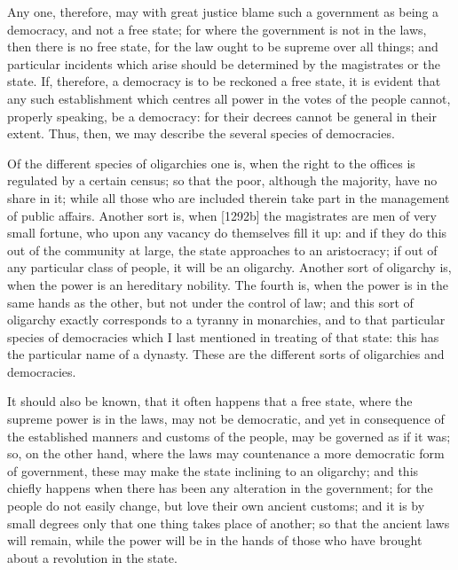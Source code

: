 Any one, therefore, may with great justice blame such a government as
being a democracy, and not a free state; for where the government is not
in the laws, then there is no free state, for the law ought to be supreme
over all things; and particular incidents which arise should be determined
by the magistrates or the state. If, therefore, a democracy is to be
reckoned a free state, it is evident that any such establishment which
centres all power in the votes of the people cannot, properly speaking, be
a democracy: for their decrees cannot be general in their extent. Thus,
then, we may describe the several species of democracies.


Of the different species of oligarchies one is, when the right to the
offices is regulated by a certain census; so that the poor, although the
majority, have no share in it; while all those who are included therein
take part in the management of public affairs. Another sort is, when
[1292b] the magistrates are men of very small fortune, who upon any
vacancy do themselves fill it up: and if they do this out of the community
at large, the state approaches to an aristocracy; if out of any particular
class of people, it will be an oligarchy. Another sort of oligarchy is,
when the power is an hereditary nobility. The fourth is, when the power is
in the same hands as the other, but not under the control of law; and this
sort of oligarchy exactly corresponds to a tyranny in monarchies, and to
that particular species of democracies which I last mentioned in treating
of that state: this has the particular name of a dynasty. These are the
different sorts of oligarchies and democracies.

It should also be known, that it often happens that a free state, where
the supreme power is in the laws, may not be democratic, and yet in
consequence of the established manners and customs of the people, may be
governed as if it was; so, on the other hand, where the laws may
countenance a more democratic form of government, these may make the state
inclining to an oligarchy; and this chiefly happens when there has been
any alteration in the government; for the people do not easily change, but
love their own ancient customs; and it is by small degrees only that one
thing takes place of another; so that the ancient laws will remain, while
the power will be in the hands of those who have brought about a
revolution in the state.


